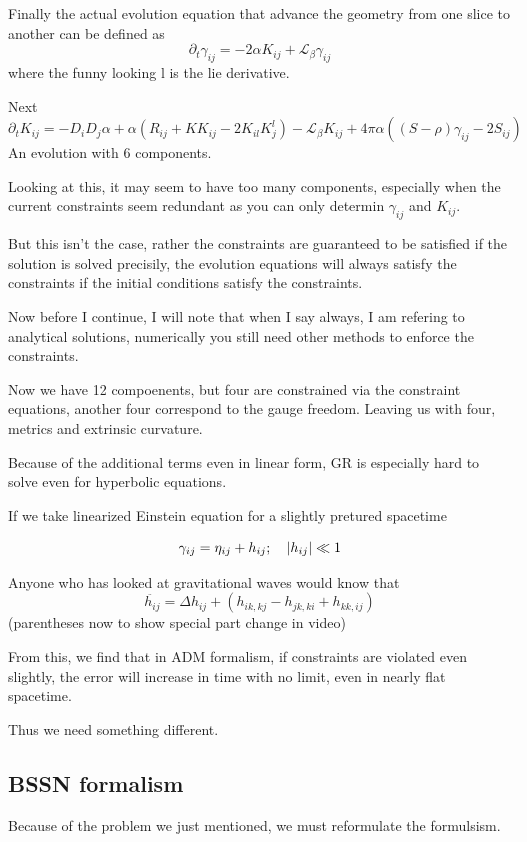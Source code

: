 Finally the actual evolution equation that advance the geometry from one slice to another can be defined as
\[
	\partial_t \gamma_{ij} = -2 \alpha K_{ij} + \mathcal{L}_\beta \gamma_{ij}
\]
where the funny looking l is the lie derivative.

Next
\[
	\partial_t K_{ij} = -D_i D_j \alpha + \alpha (R_{ij} + KK_{ij} - 2K_{il}K^l_j) - \mathcal{L}_\beta K_{ij} + 4\pi \alpha ((S- \rho )\gamma_{ij} - 2S_{ij})
\]
An evolution with 6 components.

Looking at this, it may seem to have too many components, especially when the current constraints seem redundant as you can only determin $\gamma_{ij}$ and $K_{ij}$.

But this isn't the case, rather the constraints are guaranteed to be satisfied if the solution is solved precisily, the evolution equations will always satisfy the constraints if the initial conditions satisfy the constraints.

Now before I continue, I will note that when I say always, I am refering to analytical solutions, numerically you still need other methods to enforce the constraints.

Now we have 12 compoenents, but four are constrained via the constraint equations, another four correspond to the gauge freedom. Leaving us with four, metrics and extrinsic curvature.

Because of the additional terms even in linear form, GR is especially hard to solve even for hyperbolic equations.

If we take linearized Einstein equation for a slightly pretured spacetime

\[
	\gamma_{ij} = \eta_{ij} + h_{ij}; \quad \abs{h_{ij}} \ll 1
\]

Anyone who has looked at gravitational waves would know that
\[
	\ddot{h_{ij}} = \Delta h_{ij} + (h_{ik,kj} - h_{jk,ki} + h_{kk, ij})
\]
(parentheses now to show special part change in video)


From this, we find that in ADM formalism, if constraints are violated even slightly, the error will increase in time with no limit, even in nearly flat spacetime.

Thus we need something different.

\subsection{BSSN formalism}

Because of the problem we just mentioned, we must reformulate the formulsism.

